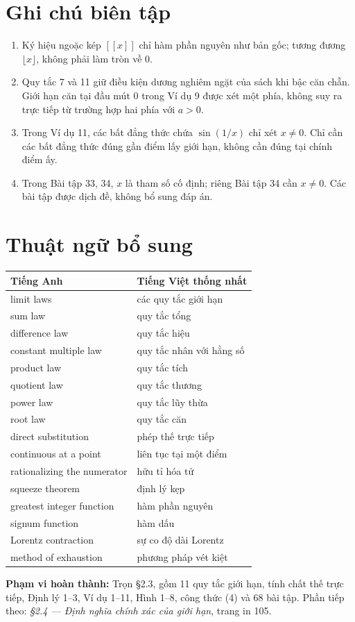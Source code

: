 \documentclass[12pt,a4paper]{article}
\newcommand{\gint}[1]{\left[\!\left[#1\right]\!\right]}
\begin{document}
\section*{Ghi chú biên tập}
\begin{enumerate}
\item Ký hiệu ngoặc kép $\gint{x}$ chỉ hàm phần nguyên như bản gốc; tương đương $\lfloor x\rfloor$, không phải làm tròn về 0.
\item Quy tắc 7 và 11 giữ điều kiện dương nghiêm ngặt của sách khi bậc căn chẵn. Giới hạn căn tại đầu mút 0 trong Ví dụ 9 được xét một phía, không suy ra trực tiếp từ trường hợp hai phía với $a>0$.
\item Trong Ví dụ 11, các bất đẳng thức chứa $\sin(1/x)$ chỉ xét $x\ne0$. Chỉ cần các bất đẳng thức đúng gần điểm lấy giới hạn, không cần đúng tại chính điểm ấy.
\item Trong Bài tập 33, 34, $x$ là tham số cố định; riêng Bài tập 34 cần $x\ne0$. Các bài tập được dịch đề, không bổ sung đáp án.
\end{enumerate}
\section*{Thuật ngữ bổ sung}
\begin{center}\begin{tabular}{ll}\toprule Tiếng Anh&Tiếng Việt thống nhất\\\midrule
limit laws&các quy tắc giới hạn\\
sum law&quy tắc tổng\\
difference law&quy tắc hiệu\\
constant multiple law&quy tắc nhân với hằng số\\
product law&quy tắc tích\\
quotient law&quy tắc thương\\
power law&quy tắc lũy thừa\\
root law&quy tắc căn\\
direct substitution&phép thế trực tiếp\\
continuous at a point&liên tục tại một điểm\\
rationalizing the numerator&hữu tỉ hóa tử\\
squeeze theorem&định lý kẹp\\
greatest integer function&hàm phần nguyên\\
signum function&hàm dấu\\
Lorentz contraction&sự co độ dài Lorentz\\
method of exhaustion&phương pháp vét kiệt\\
\bottomrule\end{tabular}\end{center}
\noindent\textbf{Phạm vi hoàn thành:} Trọn §2.3, gồm 11 quy tắc giới hạn, tính chất thế trực tiếp, Định lý 1–3, Ví dụ 1–11, Hình 1–8, công thức (4) và 68 bài tập. Phần tiếp theo: \textit{§2.4 — Định nghĩa chính xác của giới hạn}, trang in 105.
\end{document}
